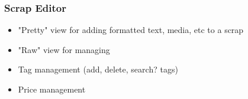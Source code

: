 \documentclass[letterpaper, 10pt, draftclsnofoot, onecolumn]{IEEEtran}
\begin{document}
\subsubsection[System feature 6: [ Scrap Editor
{]}]{\rmfamily\bfseries\color{black}  Scrap Editor}
\begin{itemize}
\item "Pretty" view for adding formatted text, media, etc to a scrap
\item "Raw" view for managing
\item Tag management (add, delete, search? tags)
\item Price management
\end{itemize}

\bigskip

\bigskip
{}


\bigskip
\end{document}
